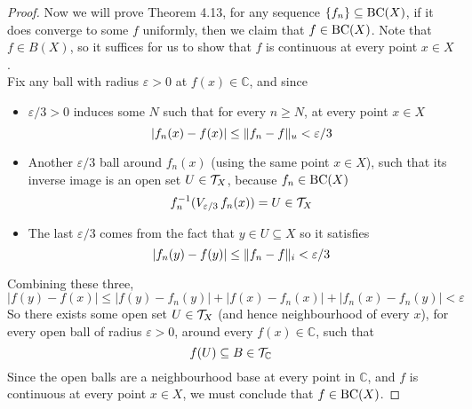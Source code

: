 \documentclass[../../main.tex]{subfiles}
\begin{document}
\begin{proof}
    Now we will prove Theorem 4.13, for any sequence $\{f_n\}\subseteq \operatorname{BC}({X})$, if it does converge to some $f$ uniformly, then we claim that $f\in \operatorname{BC}({X})$. Note that $f\in B(X)$, so it suffices for us to show that $f$ is continuous at every point $x\in X$.\\
    
    Fix any ball with radius $\varepsilon>0$ at $f(x)\in\mathbb{C}$, and since
    \begin{itemize}
        \item $\varepsilon/3>0$ induces some $N$ such that for every $n\geq N$, at every point $x\in X$
        \[
        |f_n(x)-f(x)|\leq\lVert {f_n-f} \rVert_u<\varepsilon/3
        \]
        \item Another $\varepsilon/3$ ball around $f_n(x)$ (using the same point $x\in X$), such that its inverse image is an open set $U\in \mathcal{T}_X$, because $f_n\in \operatorname{BC}({X})$
        \[
        f_n^{-1}(V_{\varepsilon/3}\,f_n(x)) = U\in\mathcal{T}_X
        \]
        \item The last $\varepsilon/3$ comes from the fact that $y\in U\subseteq X$ so it satisfies
        \[
        |f_n(y)-f(y)|\leq \lVert {f_n-f} \rVert_i<\varepsilon/3
        \]
    \end{itemize}
    Combining these three, 
    \[
    |f(y)-f(x)|\leq |f(y)-f_n(y)|+|f(x)-f_n(x)|+|f_n(x)-f_n(y)|< \varepsilon
    \]
    So there exists some open set $U\in\mathcal{T}_X$ (and hence neighbourhood of every $x$), for every open ball of radius $\varepsilon>0$, around every $f(x)\in \mathbb{C}$, such that
    \[
    f(U)\subseteq B\in \mathcal{T}_\mathbb{C}
    \]
    Since the open balls are a neighbourhood base at every point in $\mathbb{C}$, and $f$ is continuous at every point $x\in X$, we must conclude that $f\in\operatorname{BC}({X})$.
\end{proof}
\end{document}
